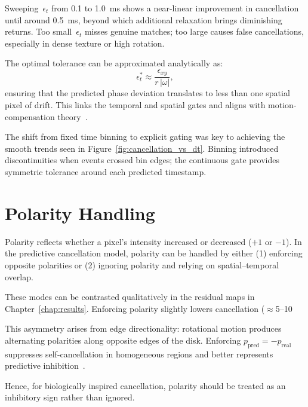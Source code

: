 Sweeping~\(\epsilon_t\) from 0.1 to 1.0~ms shows a near-linear improvement in cancellation until around 0.5~ms, beyond which additional relaxation brings diminishing returns.
Too small~\(\epsilon_t\) misses genuine matches; too large causes false cancellations, especially in dense texture or high rotation.

The optimal tolerance can be approximated analytically as:
\[
\epsilon_t^{*} \approx \frac{\epsilon_{xy}}{r\,|\omega|},
\]
ensuring that the predicted phase deviation translates to less than one spatial pixel of drift.
This links the temporal and spatial gates and aligns with motion-compensation theory~\cite{Gallego2018CMax, Xu2020TCI}.

The shift from fixed time binning to explicit gating was key to achieving the smooth trends seen in Figure~\ref{fig:cancellation_vs_dt}.
Binning introduced discontinuities when events crossed bin edges; the continuous gate provides symmetric tolerance around each predicted timestamp.

\section{Polarity Handling}
\label{sec:polarity}

Polarity reflects whether a pixel’s intensity increased or decreased (\(+1\) or \(-1\)).
In the predictive cancellation model, polarity can be handled by either (1) enforcing opposite polarities or (2) ignoring polarity and relying on spatial–temporal overlap.

These modes can be contrasted qualitatively in the residual maps in Chapter~\ref{chap:results}.
Enforcing polarity slightly lowers cancellation (\(\approx\)5–10%

This asymmetry arises from edge directionality: rotational motion produces alternating polarities along opposite edges of the disk. Enforcing \(p_{\text{pred}} = -p_{\text{real}}\) suppresses self-cancellation in homogeneous regions and better represents predictive inhibition~\cite{Hosoya2005RetinaPC,Rao1999V1PC}.

Hence, for biologically inspired cancellation, polarity should be treated as an inhibitory sign rather than ignored.

